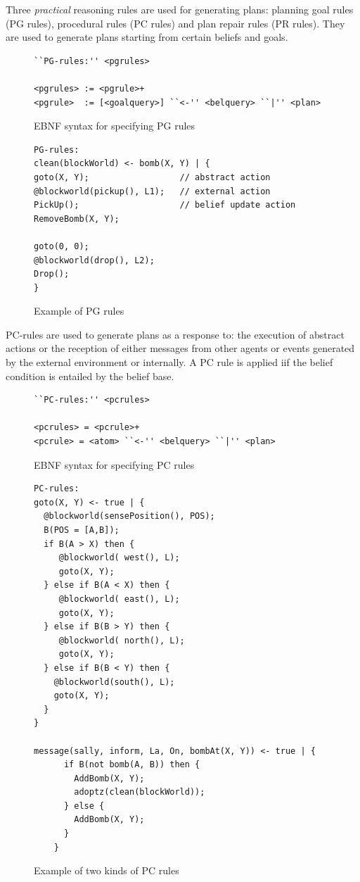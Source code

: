 \documentclass[a4paper]{article}
\begin{document}
Three \emph{practical} reasoning rules are used for generating plans: planning goal rules (PG rules), procedural rules (PC rules) and plan repair rules (PR rules). They are used to generate plans starting from certain beliefs and goals.

\begin{figure}[htp]
\begin{verbatim}
``PG-rules:'' <pgrules>

<pgrules> := <pgrule>+
<pgrule>  := [<goalquery>] ``<-'' <belquery> ``|'' <plan>
\end{verbatim}
\caption{EBNF syntax for specifying PG rules}
\label{fig:ebnf_pgrules}
\end{figure}

\begin{figure}[htp]
\begin{verbatim}
PG-rules:
clean(blockWorld) <- bomb(X, Y) | { 
goto(X, Y);                  // abstract action
@blockworld(pickup(), L1);   // external action
PickUp();                    // belief update action
RemoveBomb(X, Y);

goto(0, 0);
@blockworld(drop(), L2);
Drop();
}
\end{verbatim}
\caption{Example of PG rules}
\label{fig:example_pgrules}
\end{figure}


PC-rules are used to generate plans as a response to: the execution of abstract actions or the reception of either messages from other agents or events generated by the external environment or internally. A PC rule is applied iif the belief condition is entailed by the belief base.

\begin{figure}[htp]
\begin{verbatim}
``PC-rules:'' <pcrules>

<pcrules> = <pcrule>+
<pcrule> = <atom> ``<-'' <belquery> ``|'' <plan>
\end{verbatim}
\caption{EBNF syntax for specifying PC rules}
\label{fig:ebnf_pcrules}
\end{figure}

\begin{figure}[htp]
\begin{verbatim}
PC-rules:
goto(X, Y) <- true | {
  @blockworld(sensePosition(), POS);
  B(POS = [A,B]);
  if B(A > X) then {
     @blockworld( west(), L);
     goto(X, Y);
  } else if B(A < X) then {
     @blockworld( east(), L);
     goto(X, Y);
  } else if B(B > Y) then {
     @blockworld( north(), L);
     goto(X, Y);
  } else if B(B < Y) then {
    @blockworld(south(), L);
    goto(X, Y);
  }
}

message(sally, inform, La, On, bombAt(X, Y)) <- true | {
	  if B(not bomb(A, B)) then { 
	    AddBomb(X, Y);
	    adoptz(clean(blockWorld));
	  } else { 
	    AddBomb(X, Y);
	  }
	}
\end{verbatim}
\caption{Example of two kinds of PC rules}
\label{fig:example_pcrules}
\end{figure}
\end{document}
